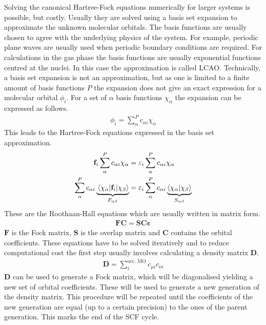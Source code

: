Solving the canonical Hartree-Fock equations numerically for larger systems is
possible, but costly.  Usually they are solved using a basis set expansion to
approximate the unknown molecular orbitals. The basis functions are usually
chosen to agree with the underlying physics of the system. For example,
periodic plane waves are usually used when periodic boundary conditions are
required. For calculations in the gas phase the basis functions are usually
exponential functions centred at the nuclei. In this case the approximation is
called \ac{LCAO}.  Technically, a basis set expansion is not an approximation,
but as one is limited to a finite amount of basis functions $P$ the expansion
does not give an exact expression for a molecular orbital $\phi_i$. For a set
of $\alpha$ basis functions $\chi_\alpha$ the expansion can be expressed as
follows.
%
\begin{align}
    \phi_i=\sum_\alpha^Pc_{\alpha i}\chi_\alpha
\end{align}
%
This leads to the Hartree-Fock equations expressed in the basis set
approximation.
%
\begin{align}
    \begin{aligned}
        \mathbf{f}_i\sum_\alpha^Pc_{\alpha i}\chi_\alpha&=\varepsilon_i\sum_\alpha^Pc_{\alpha i}\chi_\alpha \\
        \sum_\alpha^Pc_{\alpha i}\underbrace{\mel{\chi_\alpha}{\mathbf{f}_i}{\chi_\beta}}_{F_{\alpha\beta}}&=\varepsilon_i\sum_\alpha^Pc_{\alpha i}\underbrace{\braket{\chi_\alpha}{\chi_\beta}}_{S_{\alpha\beta}}
    \end{aligned}
\end{align}
%
These are the Roothaan-Hall
equations\autocite{Roothaan_NewDevelopmentsMolecular_1951,Hall_molecularorbitaltheory_1951}
which are usually written in matrix form.
%
\begin{align}
    \mathbf{FC}=\mathbf{SC\varepsilon}
\end{align}
%
$\mathbf{F}$ is the Fock matrix, $\mathbf{S}$ is the overlap matrix and
$\mathbf{C}$ contains the orbital coefficients. These equations have to be
solved iteratively and to reduce computational cost the first step usually
involves calculating a density matrix $\mathbf{D}$.
%
\begin{align}
    \mathbf{D}=\sum_{i}^\text{occ. MO} c_{\mu i}c_{\nu i}
\end{align}
%
$\mathbf{D}$ can be used to generate a Fock matrix, which will be diagonalised
yielding a new set of orbital coefficients. These will be used to generate a
new generation of the density matrix. This procedure will be repeated until
the coefficients of the new generation are equal (up to a certain precision)
to the ones of the parent generation. This marks the end of the \ac{SCF} cycle.

